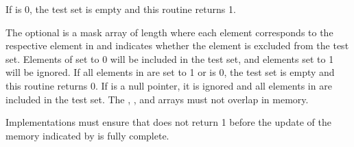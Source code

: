 \begin{apidefinition}
{    If  is 0, the test set is empty and this routine returns 1.

    The optional  is a mask array of length  where each element
    corresponds to the respective element in  and indicates whether
    the element is excluded from the test set.  Elements of  set to
    0 will be included in the test set, and elements set to 1 will be ignored.  If all elements
    in  are set to 1 or  is 0, the test set is empty
    and this routine returns 0.  If  is a null pointer, it is
    ignored and all elements in  are included in the test set.  The
    , , and  arrays must not overlap in
    memory.

    Implementations must ensure that  does not return 1
    before the update of the memory indicated by  is fully complete.
}



\end{apidefinition}
